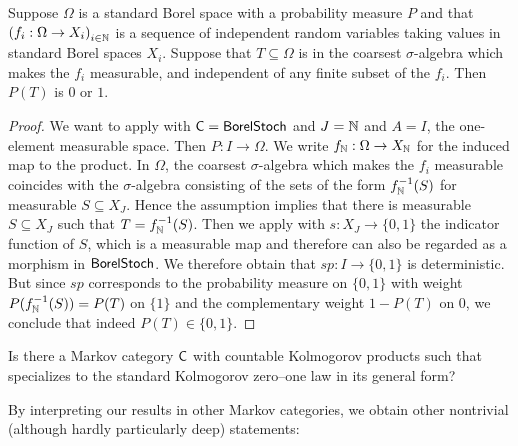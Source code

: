 \documentclass[11pt]{article}
\begin{document}
\begin{corollary}
	Suppose $\Omega$ is a standard Borel space with a probability measure $P$ and that $\left(f_i: \Omega \to X_i\right)_{i \in \mathbb{N}}$ is a sequence of independent random variables taking values in standard Borel spaces $X_i$. Suppose that $T \subseteq \Omega$ is in the coarsest $\sigma$-algebra which makes the $f_i$ measurable, and independent of any finite subset of the $f_i$.
    Then $P(T)$ is $0$ or $1$.
\end{corollary}
\begin{proof}
	We want to apply  with $\mathsf{C} = \operatorname{\mathsf{BorelStoch}}$ and $J = \mathbb{N}$ and $A = I$, the one-element measurable space. Then $P : I \to \Omega$. We write $f_{\mathbb{N}} : \Omega \to X_{\mathbb{N}}$ for the induced map to the product. In $\Omega$, the coarsest $\sigma$-algebra which makes the $f_i$ measurable coincides with the $\sigma$-algebra consisting of the sets of the form $f_{\mathbb{N}}^{-1}(S)$ for measurable $S \subseteq X_J$. Hence the assumption implies that there is measurable $S \subseteq X_J$ such that $T = f_{\mathbb{N}}^{-1}(S)$. Then we apply  with $s : X_J \to \{0,1\}$ the indicator function of $S$, which is a measurable map and therefore can also be regarded as a morphism in $\operatorname{\mathsf{BorelStoch}}$. We therefore obtain that $sp : I \to \{0,1\}$ is deterministic. But since $sp$ corresponds to the probability measure on $\{0,1\}$ with weight $P(f_{\mathbb{N}}^{-1}(S)) = P(T)$ on $\{1\}$ and the complementary weight $1 - P(T)$ on $0$, we conclude that indeed $P(T) \in \{0,1\}$.
\end{proof}

\begin{problem}
	Is there a Markov category $\mathsf{C}$ with countable Kolmogorov products such that  specializes to the standard Kolmogorov zero--one law in its general form?
\end{problem}


By interpreting our results in other Markov categories, we obtain other nontrivial (although hardly particularly deep) statements:
\end{document}
